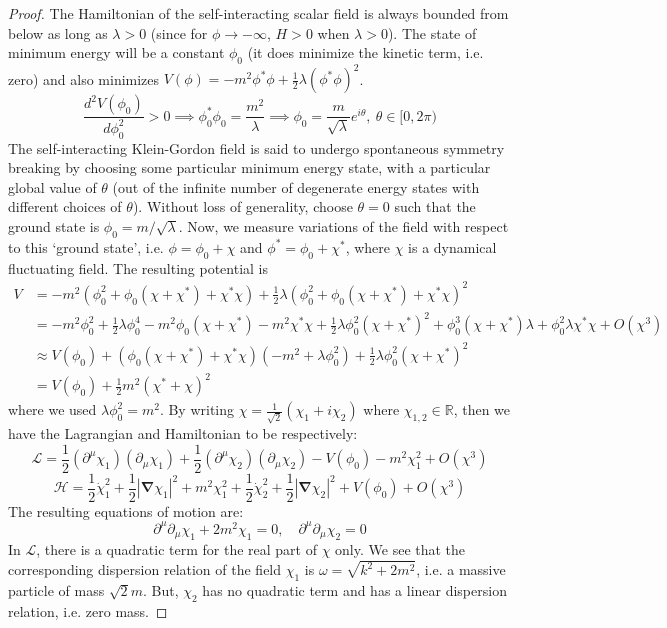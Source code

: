 \documentclass[a4paper]{article}
\theoremstyle{new}
\begin{document}
\begin{proof}
The Hamiltonian of the self-interacting scalar field is always bounded from below as long as $\lambda>0$ (since for $\phi\rightarrow-\infty$, $H>0$ when $\lambda>0$). The state of minimum energy will be a constant $\phi_0$ (it does minimize the kinetic term, i.e. zero) and also minimizes $V(\phi)=-m^2\phi^*\phi+\frac{1}{2}\lambda(\phi^*\phi)^2$. 
$$\frac{d^2V(\phi_0)}{d\phi_0^2}>0\implies \phi_0^*\phi_0=\frac{m^2}{\lambda}\implies\phi_0=\frac{m}{\sqrt{\lambda}}e^{i\theta},~\theta\in[0,2\pi)$$
The self-interacting Klein-Gordon field is said to undergo spontaneous symmetry breaking by choosing some particular minimum energy state, with a particular global value of $\theta$ (out of the infinite number of degenerate energy states with different choices of $\theta$). Without loss of generality, choose $\theta=0$ such that the ground state is $\phi_0=m/\sqrt{\lambda}$. Now, we measure variations of the field with respect to this `ground state', i.e. $\phi=\phi_0+\chi$ and $\phi^*=\phi_0+\chi^*$, where $\chi$ is a dynamical fluctuating field. The resulting potential is
\begin{align}
V&=-m^2(\phi_0^2+\phi_0(\chi+\chi^*)+\chi^*\chi)+\frac{1}{2}\lambda(\phi_0^2+\phi_0(\chi+\chi^*)+\chi^*\chi)^2\nonumber\\&=-m^2\phi_0^2+\frac{1}{2}\lambda\phi_0^4-m^2\phi_0(\chi+\chi^*)-m^2\chi^*\chi+\frac{1}{2}\lambda\phi_0^2(\chi+\chi^*)^2+\phi_0^3(\chi+\chi^*)\lambda+\phi_0^2\lambda\chi^*\chi+O(\chi^3)\nonumber\\&\approx V(\phi_0)+(\phi_0(\chi+\chi^*)+\chi^*\chi)(-m^2+\lambda\phi_0^2)+\frac{1}{2}\lambda\phi_0^2(\chi+\chi^*)^2\nonumber\\&=V(\phi_0)+\frac{1}{2}m^2(\chi^*+\chi)^2\nonumber
\end{align}
where we used $\lambda\phi_0^2=m^2$. By writing $\chi=\frac{1}{\sqrt{2}}(\chi_1+i\chi_2)$ where $\chi_{1,2}\in\mathbb{R}$, then we have the Lagrangian and Hamiltonian to be respectively:
$$\mathcal{L}=\frac{1}{2}(\partial^\mu\chi_1)(\partial_\mu\chi_1)+\frac{1}{2}(\partial^\mu\chi_2)(\partial_\mu\chi_2)-V(\phi_0)-m^2\chi_1^2+O(\chi^3)$$
$$\mathcal{H}=\frac{1}{2}\dot{\chi}_1^2+\frac{1}{2}|\boldsymbol{\nabla}\chi_1|^2+m^2\chi_1^2+\frac{1}{2}\dot{\chi}_2^2+\frac{1}{2}|\boldsymbol{\nabla}\chi_2|^2+V(\phi_0)+O(\chi^3)$$
The resulting equations of motion are:
$$\partial^\mu\partial_\mu\chi_1+2m^2\chi_1=0,\quad\partial^\mu\partial_\mu\chi_2=0$$
In $\mathcal{L}$, there is a quadratic term for the real part of $\chi$ only. We see that the corresponding dispersion relation of the field $\chi_1$ is $\omega=\sqrt{k^2+2m^2}$, i.e. a massive particle of mass $\sqrt{2}m$. But, $\chi_2$ has no quadratic term and has a linear dispersion relation, i.e. zero mass. 
\end{proof}
\end{document}
